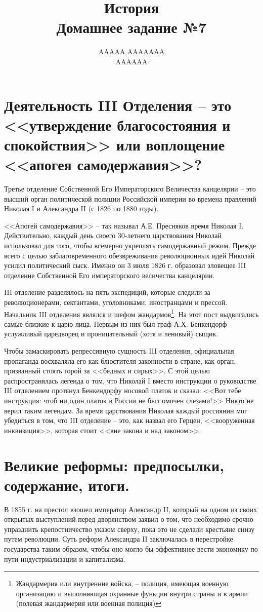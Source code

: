 \documentclass[12pt]{article}
\title{История \\ Домашнее задание №7}
\author{AAAAA AAAAAAA \\ AAAAAA}
\begin{document}
  \maketitle

  \section{Деятельность III Отделения -- это <<утверждение благосостояния и спокойствия>> или воплощение <<апогея самодержавия>>?}
  Третье отделение Собственной Его Императорского Величества канцелярии -- это высший орган политической полиции Российской империи во времена правлений Николая I и Александра II (с 1826 по 1880 годы).

  <<Апогей самодержавия>> -- так называл А.Е. Пресняков время Николая I.
  Действительно, каждый день своего 30-летнего царствования Николай использовал для того, чтобы всемерно укреплять самодержавный режим.
  Прежде всего с целью заблаговременного обезвреживания революционных идей Николай усилил политический сыск.
  Именно он 3 июля 1826 г. образовал зловещее III отделение Собственной Его императорского величества канцелярии.

  III отделение разделялось на пять экспедиций, которые следили за революционерами, сектантами, уголовниками, иностранцами и прессой.
  Начальник III отделения являлся и шефом жандармов\footnote{Жандармерия или внутренние войска, -- полиция, имеющая военную организацию и выполняющая охранные функции внутри страны и в армии (полевая жандармерия или военная полиция)}.
  На этот пост выдвигались самые близкие к царю лица.
  Первым из них был граф А.Х. Бенкендорф -- услужливый царедворец и проницательный (хотя и ленивый) сыщик.

  Чтобы замаскировать репрессивную сущность III отделения, официальная пропаганда восхваляла его как блюстителя законности в стране,
  как орган, призванный стоять горой за <<бедных и сирых>>.
  С этой целью распространялась легенда о том, что Николай I вместо инструкции о руководстве III отделением протянул Бенкендорфу носовой платок и сказал: <<Вот тебе инструкция: чтоб ни один платок в России не был омочен слезами!>>
  Никто не верил таким легендам.
  За время царствования Николая каждый россиянин мог убедиться в том, что III отделение -- это,
  как назвал его Герцен, <<вооруженная инквизиция>>, которая стоит <<вне закона и над законом>>.

  \setcounter{section}{3}
  \section{Великие реформы: предпосылки, содержание, итоги.}
  В 1855 г. на престол взошел император Александр II, который на одном из своих открытых выступлений перед дворянством заявил о том,
  что необходимо срочно упразднить крепостничество указом сверху, пока это не сделали крестьяне снизу путем революции.
  Суть реформ Александра II заключалась в перестройке государства таким образом,
  чтобы оно могло бы эффективнее вести экономику по пути индустриализации и капитализма.
\end{document}

